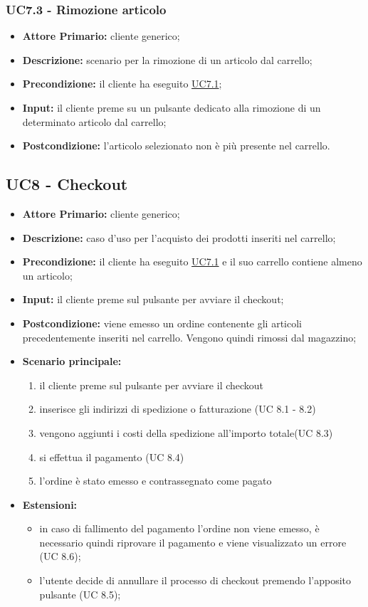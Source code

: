 \subsubsection{UC7.3 - Rimozione articolo}
\label{UC7.3}
\begin{itemize}
    \item \textbf{Attore Primario:} cliente generico;
    \item \textbf{Descrizione:} scenario per la rimozione di un articolo dal carrello;
    \item \textbf{Precondizione:} il cliente ha eseguito \hyperref[UC7.1]{UC7.1};
    \item \textbf{Input:} il cliente preme su un pulsante dedicato alla rimozione di un determinato articolo dal carrello;
    \item \textbf{Postcondizione:} l'articolo selezionato non è più presente nel carrello.
\end{itemize}

\subsection{UC8 - Checkout}
\label{UC8}
\begin{itemize}
    \item \textbf{Attore Primario:} cliente generico;
    \item \textbf{Descrizione:} caso d'uso per l'acquisto dei prodotti inseriti nel carrello;
    \item \textbf{Precondizione:} il cliente ha eseguito \hyperref[UC7.1]{UC7.1} e il suo carrello contiene almeno un articolo;
    \item \textbf{Input:} il cliente preme sul pulsante per avviare il checkout;
    \item \textbf{Postcondizione:} viene emesso un ordine contenente gli articoli precedentemente inseriti nel carrello. Vengono quindi rimossi dal magazzino;
    \item \textbf{Scenario principale:}
    \begin{enumerate}
        \item il cliente preme sul pulsante per avviare il checkout
        \item inserisce gli indirizzi di spedizione o fatturazione (UC 8.1 - 8.2)
        \item vengono aggiunti i costi della spedizione all'importo totale(UC 8.3)
        \item si effettua il pagamento (UC 8.4)
        \item l'ordine è stato emesso e contrassegnato come pagato
    \end{enumerate}
    \item \textbf{Estensioni:}
    \begin{itemize}
        \item in caso di fallimento del pagamento l'ordine non viene emesso, è necessario quindi riprovare il pagamento e viene visualizzato un errore (UC 8.6);
        \item l'utente decide di annullare il processo di checkout premendo l'apposito pulsante (UC 8.5);
    \end{itemize}
\end{itemize}

